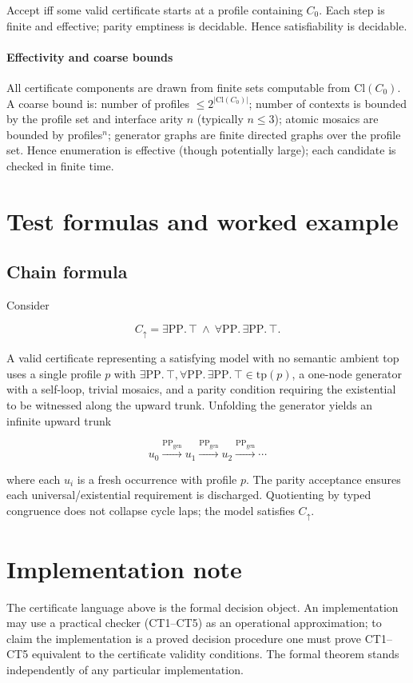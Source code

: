 \documentclass[11pt]{article}
\newcommand{\PP}{\mathrm{PP}}
\newcommand{\PPgen}{\xrightarrow{\mathrm{PP}_{\mathrm{gen}}}}
\newcommand{\some}[2]{\exists #1.\,#2}   %
\newcommand{\all}[2]{\forall #1.\,#2}   %
\newcommand{\Cl}{\mathrm{Cl}}
\newcommand{\tp}{\mathrm{tp}}
\begin{document}
Accept iff some valid certificate starts at a profile containing $C_0$. Each
step is finite and effective; parity emptiness is decidable. Hence
satisfiability is decidable.

\paragraph{Effectivity and coarse bounds}
All certificate components are drawn from finite sets computable from $\Cl(C_0)$.
A coarse bound is: number of profiles $\le 2^{|\Cl(C_0)|}$; number of contexts
is bounded by the profile set and interface arity $n$ (typically $n\le 3$);
atomic mosaics are bounded by profiles$^n$; generator graphs are finite
directed graphs over the profile set. Hence enumeration is effective (though
potentially large); each candidate is checked in finite time.

\section{Test formulas and worked example}
\label{sec:examples}

\subsection{Chain formula}
Consider


\[
C_\uparrow=\some{\PP}{\top}\ \land\ \all{\PP}{\some{\PP}{\top}}.
\]


A valid certificate representing a satisfying model with no semantic ambient
top uses a single profile $p$ with $\some{\PP}{\top},\all{\PP}{\some{\PP}{\top}}\in\tp(p)$,
a one-node generator with a self-loop, trivial mosaics, and a parity condition
requiring the existential to be witnessed along the upward trunk. Unfolding
the generator yields an infinite upward trunk


\[
u_0 \PPgen u_1 \PPgen u_2 \PPgen \cdots
\]


where each $u_i$ is a fresh occurrence with profile $p$. The parity acceptance
ensures each universal/existential requirement is discharged. Quotienting by
typed congruence does not collapse cycle laps; the model satisfies $C_\uparrow$.

\section{Implementation note}
\label{sec:implementation}

The certificate language above is the formal decision object. An implementation
may use a practical checker (CT1–CT5) as an operational approximation; to claim
the implementation is a proved decision procedure one must prove CT1–CT5
equivalent to the certificate validity conditions. The formal theorem stands
independently of any particular implementation.
\end{document}
